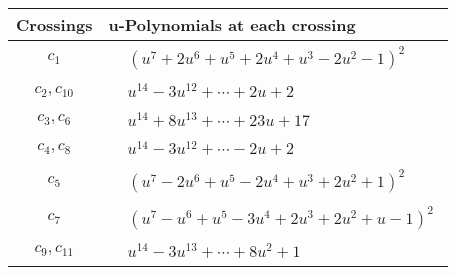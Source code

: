 \documentclass[1p]{elsarticle_modified}
\theoremstyle{definition}
\begin{document}
\begin{tabular}{m{50pt}|m{274pt}}
Crossings & \hspace{64pt}u-Polynomials at each crossing \\
\hline $$\begin{aligned}c_{1}\end{aligned}$$&$\begin{aligned}
&(u^7+2 u^6+u^5+2 u^4+u^3-2 u^2-1)^2
\end{aligned}$\\
\hline $$\begin{aligned}c_{2},c_{10}\end{aligned}$$&$\begin{aligned}
&u^{14}-3 u^{12}+\cdots+2 u+2
\end{aligned}$\\
\hline $$\begin{aligned}c_{3},c_{6}\end{aligned}$$&$\begin{aligned}
&u^{14}+8 u^{13}+\cdots+23 u+17
\end{aligned}$\\
\hline $$\begin{aligned}c_{4},c_{8}\end{aligned}$$&$\begin{aligned}
&u^{14}-3 u^{12}+\cdots-2 u+2
\end{aligned}$\\
\hline $$\begin{aligned}c_{5}\end{aligned}$$&$\begin{aligned}
&(u^7-2 u^6+u^5-2 u^4+u^3+2 u^2+1)^2
\end{aligned}$\\
\hline $$\begin{aligned}c_{7}\end{aligned}$$&$\begin{aligned}
&(u^7- u^6+u^5-3 u^4+2 u^3+2 u^2+u-1)^2
\end{aligned}$\\
\hline $$\begin{aligned}c_{9},c_{11}\end{aligned}$$&$\begin{aligned}
&u^{14}-3 u^{13}+\cdots+8 u^2+1
\end{aligned}$\\
\hline
\end{tabular}\\~\\
\newpage\renewcommand{\arraystretch}{1}
\end{document}
